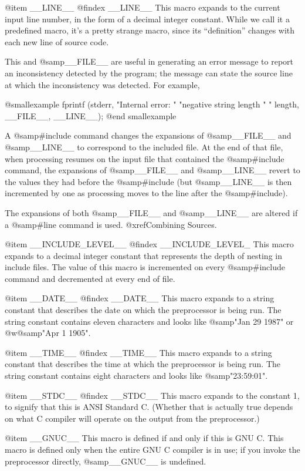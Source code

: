 {@item __LINE__
@findex __LINE__
This macro expands to the current input line number, in the form of a
decimal integer constant.  While we call it a predefined macro, it's
a pretty strange macro, since its ``definition'' changes with each
new line of source code.

This and @samp{__FILE__} are useful in generating an error message to
report an inconsistency detected by the program; the message can state
the source line at which the inconsistency was detected.  For example,

@smallexample
fprintf (stderr, "Internal error: "
		 "negative string length "
                 "%
         length, __FILE__, __LINE__);
@end smallexample

A @samp{#include} command changes the expansions of @samp{__FILE__}
and @samp{__LINE__} to correspond to the included file.  At the end of
that file, when processing resumes on the input file that contained
the @samp{#include} command, the expansions of @samp{__FILE__} and
@samp{__LINE__} revert to the values they had before the
@samp{#include} (but @samp{__LINE__} is then incremented by one as
processing moves to the line after the @samp{#include}).

The expansions of both @samp{__FILE__} and @samp{__LINE__} are altered
if a @samp{#line} command is used.  @xref{Combining Sources}.

@item __INCLUDE_LEVEL__
@findex __INCLUDE_LEVEL_
This macro expands to a decimal integer constant that represents the
depth of nesting in include files.  The value of this macro is
incremented on every @samp{#include} command and decremented at every
end of file.

@item __DATE__
@findex __DATE__
This macro expands to a string constant that describes the date on
which the preprocessor is being run.  The string constant contains
eleven characters and looks like @samp{"Jan 29 1987"} or @w{@samp{"Apr
1 1905"}}.

@item __TIME__
@findex __TIME__
This macro expands to a string constant that describes the time at
which the preprocessor is being run.  The string constant contains
eight characters and looks like @samp{"23:59:01"}.

@item __STDC__
@findex __STDC__
This macro expands to the constant 1, to signify that this is ANSI
Standard C.  (Whether that is actually true depends on what C compiler
will operate on the output from the preprocessor.)

@item __GNUC__
This macro is defined if and only if this is GNU C.  This macro is
defined only when the entire GNU C compiler is in use; if you invoke
the preprocessor directly, @samp{__GNUC__} is undefined.

}
